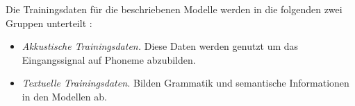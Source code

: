 Die Trainingsdaten für die beschriebenen Modelle werden in die folgenden zwei Gruppen unterteilt \cite{Tom.2016}:

\begin{itemize}
    \item \textit{Akkustische Trainingsdaten.} Diese Daten werden genutzt um das Eingangssignal auf Phoneme abzubilden.
    \item \textit{Textuelle Trainingsdaten.} Bilden Grammatik und semantische Informationen in den Modellen ab.
\end{itemize}